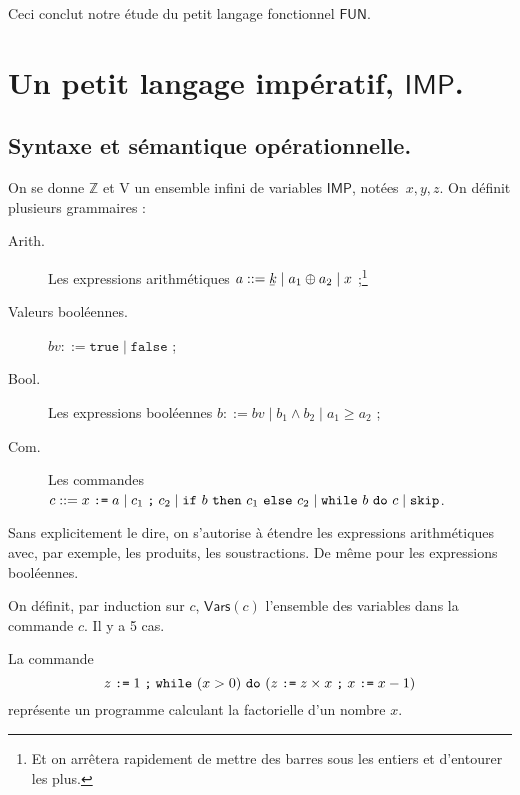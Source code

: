 \documentclass[../main]{subfiles}
\begin{document}
  \showfootnote

  Ceci conclut notre étude du petit langage fonctionnel $\mathsf{FUN}$.

  \section{Un petit langage impératif, $\mathsf{IMP}$.}

  \subsection{Syntaxe et sémantique opérationnelle.}
  On se donne $\mathds{Z}$ et $\mathrm{V}$ un ensemble infini de variables $\mathsf{IMP}$, notées~$x, y, z$.
  On définit plusieurs grammaires :

  \begin{description}
    \item[Arith.] Les expressions arithmétiques $a ::= \ubar{k}  \mid a_1 \oplus a_2  \mid x$ ;\footnote{Et on arrêtera rapidement de mettre des barres sous les entiers et d'entourer les plus.}\showfootnote
    \item[Valeurs booléennes.] $bv ::= \mathtt{true}  \mid \mathtt{false}$ ;
    \item[Bool.] Les expressions booléennes $b ::= bv  \mid b_1 \land b_2  \mid a_1 \ge a_2$ ;
    \item[Com.] Les commandes $c ::= x \mathrel{\texttt{:=}} a  \mid c_1 \mathrel{\texttt{;}} c_2  \mid \texttt{if}\ b\ \texttt{then}\ c_1\ \texttt{else}\ c_2  \mid \texttt{while}\ b\ \texttt{do}\ c  \mid \texttt{skip}$.
  \end{description}

  Sans explicitement le dire, on s'autorise à étendre les expressions arithmétiques avec, par exemple, les produits, les soustractions.
  De même pour les expressions booléennes.

  On définit, par induction sur $c$, $\mathsf{Vars}(c)$ l'ensemble des variables dans la commande $c$. Il y a 5 cas.

  \begin{exm}
    La commande \[
      z \mathrel{\texttt{:=}} 1 \mathrel{\texttt{;}} \texttt{while}\ (x > 0)\ \texttt{do}\ (z \mathrel{\texttt{:=}} z \times x \mathrel{\texttt{;}} x \mathrel{\texttt{:=}} x - 1)
    \]
    représente un programme calculant la factorielle d'un nombre $x$.
  \end{exm}
\end{document}

